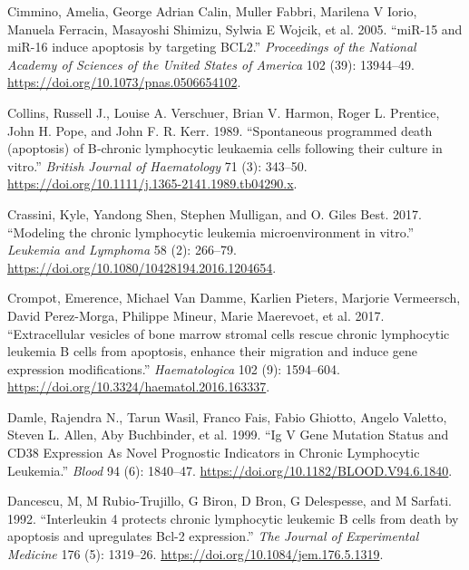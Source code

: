 \documentclass[11pt, a4paper, twosided]{book}
\newenvironment{CSLReferences}%
  {}%
  {\par}
\begin{document}
\begin{CSLReferences}{1}{0}
\leavevmode{}%
Cimmino, Amelia, George Adrian Calin, Muller Fabbri, Marilena V Iorio, Manuela Ferracin, Masayoshi Shimizu, Sylwia E Wojcik, et al. 2005. {``{miR-15 and miR-16 induce apoptosis by targeting BCL2}.''} \emph{Proceedings of the National Academy of Sciences of the United States of America} 102 (39): 13944--49. \url{https://doi.org/10.1073/pnas.0506654102}.

\leavevmode{}%
Collins, Russell J., Louise A. Verschuer, Brian V. Harmon, Roger L. Prentice, John H. Pope, and John F. R. Kerr. 1989. {``{Spontaneous programmed death (apoptosis) of B‐chronic lymphocytic leukaemia cells following their culture in vitro}.''} \emph{British Journal of Haematology} 71 (3): 343--50. \url{https://doi.org/10.1111/j.1365-2141.1989.tb04290.x}.

\leavevmode{}%
Crassini, Kyle, Yandong Shen, Stephen Mulligan, and O. Giles Best. 2017. {``{Modeling the chronic lymphocytic leukemia microenvironment in vitro}.''} \emph{Leukemia and Lymphoma} 58 (2): 266--79. \url{https://doi.org/10.1080/10428194.2016.1204654}.

\leavevmode{}%
Crompot, Emerence, Michael Van Damme, Karlien Pieters, Marjorie Vermeersch, David Perez-Morga, Philippe Mineur, Marie Maerevoet, et al. 2017. {``{Extracellular vesicles of bone marrow stromal cells rescue chronic lymphocytic leukemia B cells from apoptosis, enhance their migration and induce gene expression modifications}.''} \emph{Haematologica} 102 (9): 1594--604. \url{https://doi.org/10.3324/haematol.2016.163337}.

\leavevmode{}%
Damle, Rajendra N., Tarun Wasil, Franco Fais, Fabio Ghiotto, Angelo Valetto, Steven L. Allen, Aby Buchbinder, et al. 1999. {``{Ig V Gene Mutation Status and CD38 Expression As Novel Prognostic Indicators in Chronic Lymphocytic Leukemia}.''} \emph{Blood} 94 (6): 1840--47. \url{https://doi.org/10.1182/BLOOD.V94.6.1840}.

\leavevmode{}%
Dancescu, M, M Rubio-Trujillo, G Biron, D Bron, G Delespesse, and M Sarfati. 1992. {``{Interleukin 4 protects chronic lymphocytic leukemic B cells from death by apoptosis and upregulates Bcl-2 expression.}''} \emph{The Journal of Experimental Medicine} 176 (5): 1319--26. \url{https://doi.org/10.1084/jem.176.5.1319}.


\end{CSLReferences}
\end{document}
